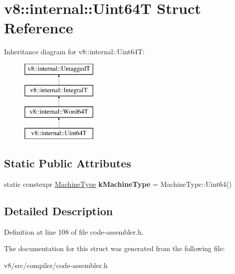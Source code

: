 \hypertarget{structv8_1_1internal_1_1Uint64T}{}\section{v8\+:\+:internal\+:\+:Uint64T Struct Reference}
\label{structv8_1_1internal_1_1Uint64T}
Inheritance diagram for v8\+:\+:internal\+:\+:Uint64T\+:\begin{figure}[H]
\begin{center}
\leavevmode
\includegraphics[height=4.000000cm]{structv8_1_1internal_1_1Uint64T}
\end{center}
\end{figure}
\subsection*{Static Public Attributes}
\begin{DoxyCompactItemize}
\item 
\mbox{\label{structv8_1_1internal_1_1Uint64T_aa875dc80ba78cdad21372ac3ca0d7327}} 
static constexpr \mbox{\hyperlink{classv8_1_1internal_1_1MachineType}{Machine\+Type}} {\bfseries k\+Machine\+Type} = Machine\+Type\+::\+Uint64()
\end{DoxyCompactItemize}


\subsection{Detailed Description}


Definition at line 108 of file code-\/assembler.\+h.



The documentation for this struct was generated from the following file\+:\begin{DoxyCompactItemize}
\item 
v8/src/compiler/code-\/assembler.\+h\end{DoxyCompactItemize}
